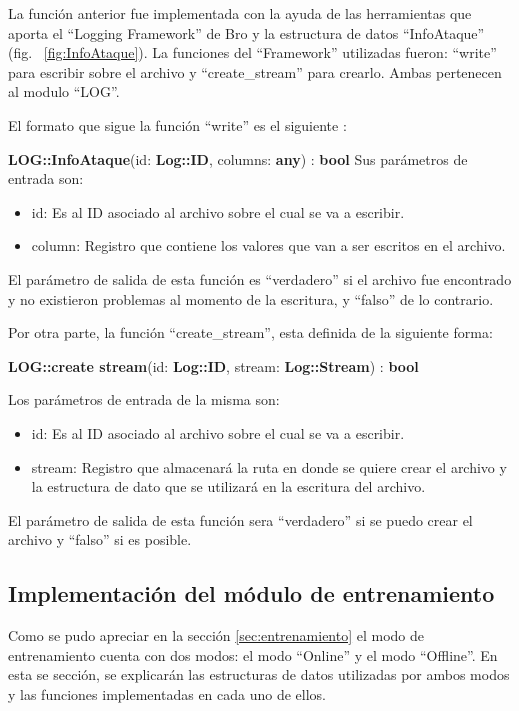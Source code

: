 La función anterior fue implementada con la ayuda de las herramientas
que aporta el ``Logging Framework'' de Bro y la estructura de datos ``InfoAtaque'' (fig. ~\ref{fig:InfoAtaque}). La funciones del ``Framework'' utilizadas fueron: ``write'' para escribir sobre el archivo y ``create\_stream'' para crearlo. Ambas pertenecen al modulo ``LOG''. 

El formato que sigue la función ``write'' es el siguiente :

\textbf{LOG::InfoAtaque}(id: \textbf{Log::ID}, columns: \textbf{any}) : \textbf{bool}
Sus parámetros de entrada son:

\begin{itemize}
\item id: Es al ID asociado al archivo sobre el cual se va a escribir.
\item column: Registro que contiene los valores que van a ser escritos en el
archivo.
\end{itemize}

El parámetro de salida de esta función es ``verdadero'' si el archivo fue encontrado y no existieron problemas al momento de la escritura, y ``falso'' de
lo contrario.

Por otra parte, la función ``create\_stream'', esta definida de la siguiente
forma:

\textbf{LOG::create stream}(id: \textbf{Log::ID}, stream: \textbf{Log::Stream}) : \textbf{bool}

Los parámetros de entrada de la misma son:

\begin{itemize}
\item id: Es al ID asociado al archivo sobre el cual se va a escribir.
\item stream: Registro que almacenará la ruta en donde se quiere crear el
archivo y la estructura de dato que se utilizará en la escritura del
archivo.
\end{itemize}

El parámetro de salida de esta función sera ``verdadero'' si se puedo crear el
archivo y ``falso'' si es posible.

\subsection{Implementación del módulo de entrenamiento}

Como se pudo apreciar en la sección \ref{sec:entrenamiento} el modo de entrenamiento cuenta con dos modos: el modo ``Online'' y el modo ``Offline''. En esta se sección, se explicarán las estructuras de datos utilizadas por ambos modos y las funciones implementadas en cada uno de ellos.

